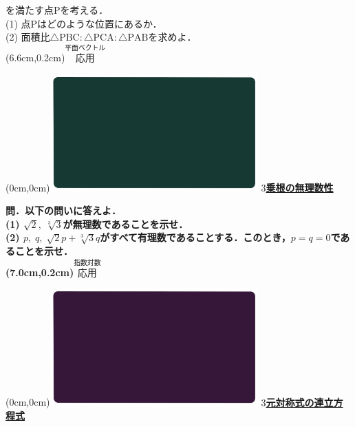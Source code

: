 \documentclass[10pt,
fleqn,
dvipdfmx,
uplatex
]{jsarticle}
\begin{document}
を満たす点$\text{P}$を考える．\\
(1)  点$\text{P}$はどのような位置にあるか．\\
(2)  面積比$\triangle \text{PBC}:\triangle \text{PCA}:\triangle \text{PAB}$を求めよ．\\

\at(6.6cm,0.2cm){\small\color{bradorange}$\overset{\text{平面ベクトル}}{\text{応用}}$}


\newpage



\at(0cm,0cm){\includegraphics[width=8cm,bb=0 0 1920 1080]{./youtube/thumbnails/templates/smart_background/指数対数.jpeg}}
{\color{orange}\bf\boldmath\huge\underline{$3$乗根の無理数性}}\vspace{0.3zw}

\large 
\bf\boldmath 問．以下の問いに答えよ．\\
(1)  $\sqrt 2,\;\sqrt[3]3$が無理数であることを示せ．\\
(2)  $p,\;q,\;\sqrt 2p+\sqrt[3]3q$がすべて有理数であることする．このとき，$p=q=0$であることを示せ．\\

\at(7.0cm,0.2cm){\small\color{bradorange}$\overset{\text{指数対数}}{\text{応用}}$}


\newpage



\at(0cm,0cm){\includegraphics[width=8cm,bb=0 0 1920 1080]{./youtube/thumbnails/templates/smart_background/複素数と方程式.jpeg}}
{\color{orange}\bf\boldmath\LARGE\underline{$3$元対称式の連立方程式}}\vspace{0.3zw}
\end{document}
